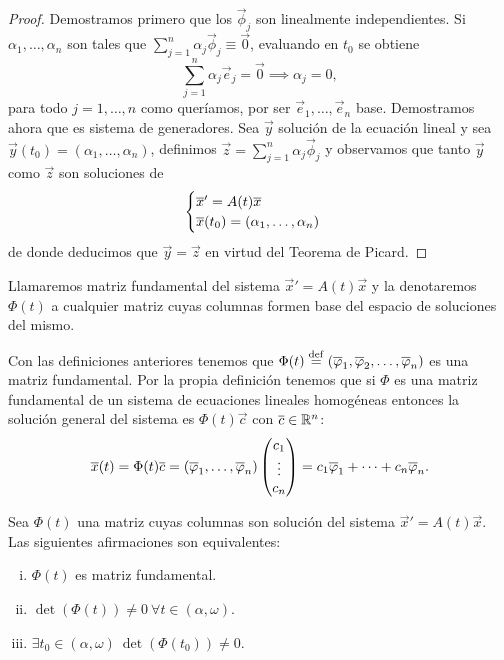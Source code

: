 \documentclass[../ecuaciones_diferenciales.tex]{subfiles}
\begin{document}
\begin{proof}
	Demostramos primero que los \(\vec{\phi}_j\) son linealmente independientes.
	Si \(\alpha_1, \dots, \alpha_n\) son tales que
	\(\sum_{j = 1}^n \alpha_j \vec{\phi}_j \equiv \vec{0}\),
	evaluando en \(t_0\) se obtiene
	\[\sum_{j = 1}^n \alpha_j \vec{e}_j = \vec{0} \implies \alpha_j = 0,\]
	para todo \(j = 1, \dots, n\) como queríamos, por ser
	\(\vec{e}_1, \dots, \vec{e}_n\) base.
	Demostramos ahora que es sistema de generadores. Sea \(\vec{y}\) solución
	de la ecuación lineal y sea
	\(\vec{y}(t_0) = (\alpha_1, \dots, \alpha_n)\),
	definimos \(\vec{z} = \sum_{j = 1}^n \alpha_j \vec{\phi}_j\) y observamos
	que tanto \(\vec{y}\) como \(\vec{z}\) son soluciones de
	\[\begin{cases}
		\overline{x}' = A(t)\overline{x} \\
		\overline{x}(t_0) = (\alpha_1, \dots, \alpha_n)\end{cases}\]
	de donde deducimos que \(\vec{y} = \vec{z}\) en virtud del
	Teorema de Picard.
\end{proof}

\begin{definition}
	Llamaremos matriz fundamental del sistema
	\(\vec{x}' = A(t)\vec{x}\) y la denotaremos
	\(\Phi(t)\) a cualquier matriz cuyas columnas formen base del espacio de
	soluciones del mismo.
\end{definition}

Con las definiciones anteriores tenemos que
\(\Phi(t) \overset{\operatorname{def}}{=} (\overline{\varphi}_1, \overline{\varphi}_2, \dots, \overline{\varphi}_n)\) es una matriz
fundamental. Por la propia definición tenemos que si \(\Phi\) es una matriz
fundamental de un sistema de ecuaciones lineales homogéneas entonces la solución
general del sistema es \(\Phi(t)\vec{c}\) con \(\overline{c} \in \mathbb{R}^n\):
\[\overline{x}(t) = \Phi(t) \overline{c}
	= (\overline{\varphi}_1, \dots, \overline{\varphi}_n) \begin{pmatrix}c_1 \\ \vdots \\ c_n\end{pmatrix} =
	c_1\overline{\varphi}_1 + \cdots + c_n\overline{\varphi}_n.\]

\begin{proposition}
	Sea \(\Phi(t)\) una matriz cuyas columnas son solución del sistema
	\(\vec{x}' = A(t)\vec{x}\). Las siguientes afirmaciones son equivalentes:
	\begin{multicols}{2}
	\begin{enumerate}[i)]
		\item \(\Phi(t)\) es matriz fundamental.

		\item \(\det(\Phi(t)) \neq 0 \ \forall t \in (\alpha, \omega)\).

		\item \(\exists t_0 \in (\alpha, \omega) \ \det(\Phi(t_0)) \neq 0\).
	\end{enumerate}
	\end{multicols}
\end{proposition}
\end{document}

